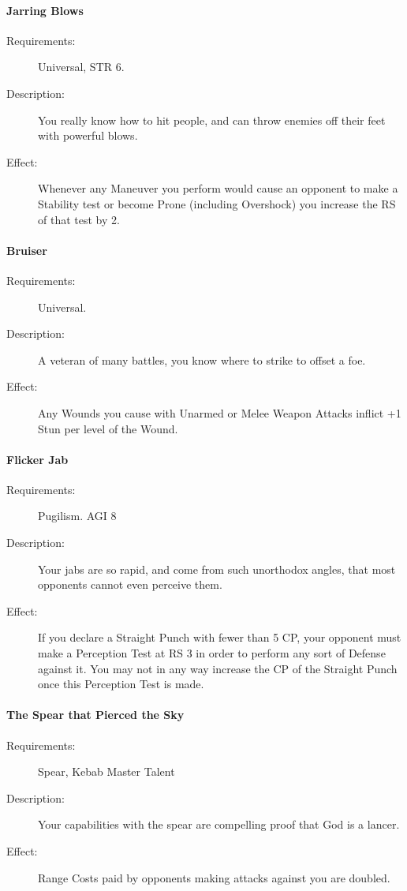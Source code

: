 \documentclass[oneside,11pt,english]{book}
\begin{document}
\paragraph{\label{talent:Jarring Blows}Jarring Blows}
	\begin{description}
		\item [Requirements:] Universal, STR 6. 
		\item [Description:] You really know how to hit people, and can throw enemies off their feet with powerful blows. 
		\item [Effect:] Whenever any Maneuver you perform would cause an opponent to make a Stability test or become Prone (including Overshock) you increase the RS of that test by 2. 

	\end{description}
\paragraph{\label{talent:Bruiser}Bruiser}
	\begin{description}
		\item [Requirements:] Universal. 
		\item [Description:] A veteran of many battles, you know where to strike to offset a foe. 
		\item [Effect:] Any Wounds you cause with Unarmed or Melee Weapon Attacks inflict +1 Stun per level of the Wound. 

	\end{description}
\paragraph{\label{talent:Flicker Jab}Flicker Jab}
	\begin{description}
		\item [Requirements:] Pugilism. AGI 8 
		\item [Description:] Your jabs are so rapid, and come from such unorthodox angles, that most opponents cannot even perceive them. 
		\item [Effect:] If you declare a Straight Punch with fewer than 5 CP, your opponent must make a Perception Test at RS 3 in order to perform any sort of Defense against it. You may not in any way increase the CP of the Straight Punch once this Perception Test is made.
	\end{description}
\paragraph{\label{talent:The Spear that Pierced the Sky}The Spear that Pierced the Sky}
	\begin{description}
		\item [Requirements:] Spear, Kebab Master Talent 
		\item [Description:] Your capabilities with the spear are compelling proof that God is a lancer. 
		\item [Effect:] Range Costs paid by opponents making attacks against you are doubled. 
	\end{description}
\end{document}
